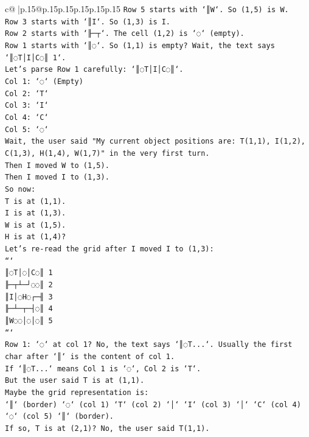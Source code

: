 \documentclass{article}
\begin{document}
{\begin{supertabular}{c@{$\;$}|p{.15\linewidth}@{}p{.15\linewidth}p{.15\linewidth}p{.15\linewidth}p{.15\linewidth}p{.15\linewidth}}
{{{\texttt{Row 5 starts with `║W`. So (1,5) is W.} \\
\texttt{Row 3 starts with `║I`. So (1,3) is I.} \\
\texttt{Row 2 starts with `╟─┬`. The cell (1,2) is `◌` (empty).} \\
\texttt{Row 1 starts with `║◌`. So (1,1) is empty? Wait, the text says `║◌T│I│C◌║ 1`.} \\
\texttt{Let's parse Row 1 carefully: `║◌T│I│C◌║`.} \\
\texttt{Col 1: `◌` (Empty)} \\
\texttt{Col 2: `T`} \\
\texttt{Col 3: `I`} \\
\texttt{Col 4: `C`} \\
\texttt{Col 5: `◌`} \\
\texttt{Wait, the user said "My current object positions are: T(1,1), I(1,2), C(1,3), H(1,4), W(1,7)" in the very first turn.} \\
\texttt{Then I moved W to (1,5).} \\
\texttt{Then I moved I to (1,3).} \\
\texttt{So now:} \\
\texttt{T is at (1,1).} \\
\texttt{I is at (1,3).} \\
\texttt{W is at (1,5).} \\
\texttt{H is at (1,4)?} \\
\texttt{Let's re{-}read the grid after I moved I to (1,3):} \\
\texttt{```} \\
\texttt{║◌T│◌│C◌║ 1} \\
\texttt{╟─┬┴─┘◌◌║ 2} \\
\texttt{║I│◌H◌┌─╢ 3} \\
\texttt{╟─┴─┬─┤◌║ 4} \\
\texttt{║W◌◌│◌│◌║ 5} \\
\texttt{```} \\
\texttt{Row 1: `◌` at col 1? No, the text says `║◌T...`. Usually the first char after `║` is the content of col 1.} \\
\texttt{If `║◌T...` means Col 1 is `◌`, Col 2 is `T`.} \\
\texttt{But the user said T is at (1,1).} \\
\texttt{Maybe the grid representation is:} \\
\texttt{`║` (border) `◌` (col 1) `T` (col 2) `│` `I` (col 3) `│` `C` (col 4) `◌` (col 5) `║` (border).} \\
\texttt{If so, T is at (2,1)? No, the user said T(1,1).} \\
}}}
\end{supertabular}}
\end{document}
